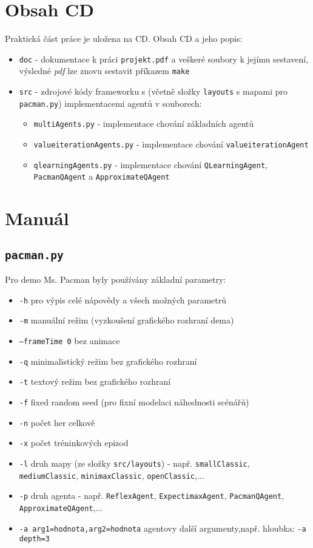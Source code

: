 \chapter{Obsah CD}
Praktická část práce je uložena na CD. Obsah CD a jeho popis:
\begin{itemize}
\item \texttt{doc} - dokumentace k práci \texttt{projekt.pdf} a veškeré soubory k jejímu sestavení, výsledné \textit{pdf} lze znovu sestavit příkazem \texttt{make}
\item \texttt{src} - zdrojové kódy frameworku s (včetně složky \texttt{layouts} s mapami pro \texttt{pacman.py}) implementacemi agentů v souborech:
\begin{itemize}
\item \texttt{multiAgents.py} - implementace chování základních agentů
\item \texttt{valueiterationAgents.py} - implementace chování \texttt{valueiterationAgent}
\item \texttt{qlearningAgents.py} - implementace chování \texttt{QLearningAgent}, \texttt{PacmanQAgent} a \texttt{ApproximateQAgent}
\end{itemize}
\end{itemize}

\chapter{Manuál}
\label{priloha:manual}
\section{\texttt{pacman.py}}
Pro demo Ms. Pacman byly používány základní parametry:
\begin{itemize}
\item \texttt{-h} pro výpis celé nápovědy a všech možných parametrů
\item \texttt{-m} manuální režim (vyzkoušení grafického rozhraní dema)
\item \texttt{--frameTime 0} bez animace
\item \texttt{-q} minimalistický režim bez grafického rozhraní
\item \texttt{-t} textový režim bez grafického rozhraní 
\item \texttt{-f} fixed random seed (pro fixní modelaci náhodnosti scénářů)
\item \texttt{-n} počet her celkově
\item \texttt{-x} počet tréninkových epizod
\item \texttt{-l} druh mapy (ze složky \texttt{src/layouts}) - např. \texttt{smallClassic}, \texttt{mediumClassic}, \newline \texttt{minimaxClassic}, \texttt{openClassic},...
\item \texttt{-p} druh agenta - např. \texttt{ReflexAgent}, \texttt{ExpectimaxAgent}, \newline \texttt{PacmanQAgent}, \texttt{ApproximateQAgent},...
\item \texttt{-a arg1=hodnota,arg2=hodnota} agentovy další argumenty,\newline např. hloubka: \texttt{-a depth=3}
\end{itemize}
